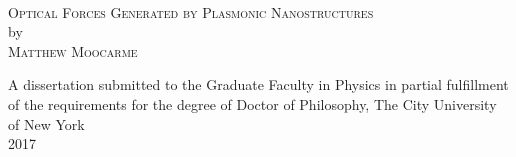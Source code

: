 \begin{titlepage}

\begin{center}

~\vspace{2in}

\textsc{Optical Forces Generated by Plasmonic Nanostructures} \\[0.5in]
by \\[0.5in]
\textsc{Matthew Moocarme} 

\vspace{\fill}
A dissertation submitted to the Graduate Faculty in Physics in partial fulfillment of the requirements for the degree of Doctor of Philosophy, The City University of New York \\[0.25in]
2017 

\end{center}

\end{titlepage}
